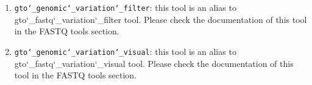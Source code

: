 \begin{enumerate}
\item \texttt{gto\char`_genomic\char`_variation\char`_filter}: this tool is an alias to gto\char`_fastq\char`_variation\char`_filter tool. Please check the documentation of this tool in the FASTQ tools section. 

\item \texttt{gto\char`_genomic\char`_variation\char`_visual}: this tool is an alias to gto\char`_fastq\char`_variation\char`_visual tool. Please check the documentation of this tool in the FASTQ tools section. 

\end{enumerate}











